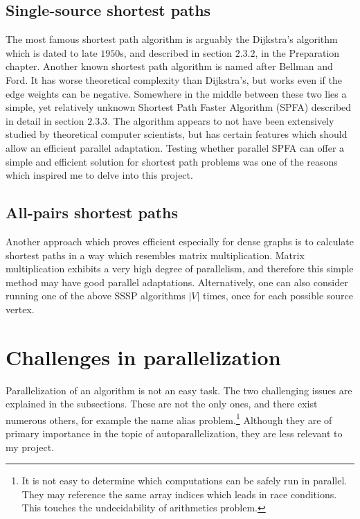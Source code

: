 \documentclass[12pt,a4paper,twoside,openright]{report}
\begin{document}
\subsection{Single-source shortest paths}
The most famous shortest path algorithm is arguably the Dijkstra's algorithm which is dated to late $1950$s, and described in section $2.3.2$, in the Preparation chapter. Another known shortest path algorithm is named after Bellman and Ford. It has worse theoretical complexity than Dijkstra's, but works even if the edge weights can be negative. Somewhere in the middle between these two lies a simple, yet relatively unknown Shortest Path Faster Algorithm (SPFA) described in detail in section $2.3.3$. The algorithm appears to not have been extensively studied by theoretical computer scientists, but has certain features which should allow an efficient parallel adaptation. Testing whether parallel SPFA can offer a simple and efficient solution for shortest path problems was one of the reasons which inspired me to delve into this project.

\subsection{All-pairs shortest paths}
Another approach which proves efficient especially for dense graphs is to calculate shortest paths in a way which resembles matrix multiplication. Matrix multiplication exhibits a very high degree of parallelism, and therefore this simple method may have good parallel adaptations. Alternatively, one can also consider running one of the above SSSP algorithms $|V|$ times, once for each possible source vertex.

\section{Challenges in parallelization}
Parallelization of an algorithm is not an easy task. The two challenging issues are explained in the subsections. These are not the only ones, and there exist numerous others, for example the name alias problem.\footnote{It is not easy to determine which computations can be safely run in parallel. They may reference the same array indices which leads in race conditions. This touches the  undecidability of arithmetics problem.} Although they are of primary importance in the topic of autoparallelization, they are less relevant to my project.
\end{document}
